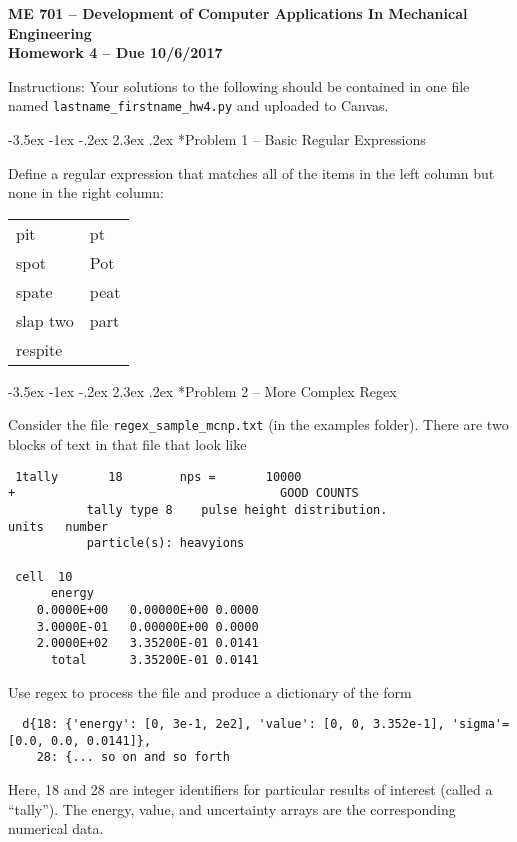 \documentclass[11pt]{article}
\makeatletter
\renewcommand\section{\@startsection{section}{1}{\z@}%
                                  {-3.5ex \@plus -1ex \@minus -.2ex}%
                                  {2.3ex \@plus.2ex}%
                                  {\normalfont\bfseries}}
\makeatother
\begin{document}
{\large
  \begin{center}
    {\bf ME 701 -- Development of Computer Applications In Mechanical Engineering \\ 
         Homework 4 -- Due 10/6/2017}         
  \end{center}
}
 
Instructions:  Your solutions to the following should be contained in
one file named {\tt lastname\_firstname\_hw4.py} and uploaded to Canvas.


\section*{Problem 1 -- Basic Regular Expressions}

Define a regular expression that matches all of the items 
in the left column but none in the right column:
\begin{tabular}{ll}
 pit  & pt\\
 spot & Pot\\
 spate & peat\\
 slap two & part\\
 respite &
\end{tabular}

\section*{Problem 2 -- More Complex Regex}

Consider the file {\tt regex\_sample\_mcnp.txt} (in the examples folder).  There are two blocks of text in that file that look like
\begin{verbatim}
 1tally       18        nps =       10000
+                                     GOOD COUNTS                                                              
           tally type 8    pulse height distribution.                   units   number         
           particle(s): heavyions
 
 cell  10                                                                                                                              
      energy   
    0.0000E+00   0.00000E+00 0.0000
    3.0000E-01   0.00000E+00 0.0000
    2.0000E+02   3.35200E-01 0.0141
      total      3.35200E-01 0.0141
\end{verbatim}
Use regex to process the file and produce a dictionary of the form 
  \begin{lstlisting}
  d{18: {'energy': [0, 3e-1, 2e2], 'value': [0, 0, 3.352e-1], 'sigma'=[0.0, 0.0, 0.0141]},
    28: {... so on and so forth
  \end{lstlisting}
Here, 18 and 28 are integer identifiers for particular results of interest (called a ``tally'').  The energy, value, and uncertainty arrays are the corresponding numerical data.
\end{document}

